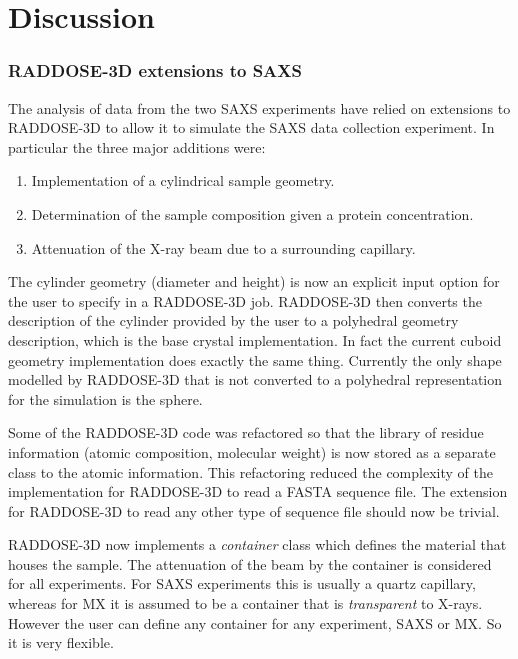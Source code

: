 \section{Discussion}
\label{sec:Discussion}

\subsubsection{RADDOSE-3D extensions to SAXS}
\label{subs:RADDOSE-3D extensions to SAXS}

The analysis of data from the two SAXS experiments have relied on extensions to RADDOSE-3D to allow it to simulate the SAXS data collection experiment.
In particular the three major additions were:
\begin{enumerate}
    \item Implementation of a cylindrical sample geometry.
    \item Determination of the sample composition given a protein concentration.
    \item Attenuation of the X-ray beam due to a surrounding capillary.
\end{enumerate}
The cylinder geometry (diameter and height) is now an explicit input option for the user to specify in a RADDOSE-3D job.
RADDOSE-3D then converts the description of the cylinder provided by the user to a polyhedral geometry description, which is the base crystal implementation.
In fact the current cuboid geometry implementation does exactly the same thing.
Currently the only shape modelled by RADDOSE-3D that is not converted to a polyhedral representation for the simulation is the sphere.

Some of the RADDOSE-3D code was refactored so that the library of residue information (atomic composition, molecular weight) is now stored as a separate class to the atomic information. This refactoring reduced the complexity of the implementation for RADDOSE-3D to read a FASTA sequence file. The extension for RADDOSE-3D to read any other type of sequence file should now be trivial.

RADDOSE-3D now implements a \textit{container} class which defines the material that houses the sample.
The attenuation of the beam by the container is considered for all experiments.
For SAXS experiments this is usually a quartz capillary, whereas for MX it is assumed to be a container that is \textit{transparent} to X-rays.
However the user can define any container for any experiment, SAXS or MX. So it is very flexible.


